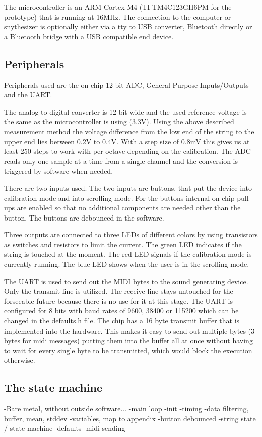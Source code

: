\documentclass{article}
\begin{document}
The microcontroller is an ARM Cortex-M4 (TI TM4C123GH6PM for the prototype) that is running at 16MHz. The connection to the computer or snythesizer is optionally either via a tty to USB converter, Bluetooth directly or a Bluetooth bridge with a USB compatible end device.

\subsection{Peripherals}
Peripherals used are the on-chip 12-bit ADC, General Purpose Inputs/Outputs and the UART.

The analog to digital converter is 12-bit wide and the used reference voltage is the same as the microcontroller is using (3.3V). Using the above described measurement method the voltage difference from the low end of the string to the upper end lies between 0.2V to 0.4V. With a step size of 0.8mV this gives us at least 250 steps to work with per octave depending on the calibration. The ADC reads only one sample at a time from a single channel and the conversion is triggered by software when needed.

There are two inputs used. The two inputs are buttons, that put the device into calibration mode and into scrolling mode. For the buttons internal on-chip pull-ups are enabled so that no additional components are needed other than the button. The buttons are debounced in the software.

Three outputs are connected to three LEDs of different colors by using transistors as switches and resistors to limit the current. The green LED indicates if the string is touched at the moment. The red LED signals if the calibration mode is currently running. The blue LED shows when the user is in the scrolling mode.

The UART is used to send out the MIDI bytes to the sound generating device. Only the transmit line is utilized. The receive line stays untouched for the forseeable future because there is no use for it at this stage. The UART is configured for 8 bits with baud rates of 9600, 38400 or 115200 which can be changed in the defaults.h file. The chip has a 16 byte transmit buffer that is implemented into the hardware. This makes it easy to send out multiple bytes (3 bytes for midi messages) putting them into the buffer all at once without having to wait for every single byte to be transmitted, which would block the execution otherwise.

\subsection{The state machine}
-Bare metal, without outside software...
-main loop
-init
-timing
-data filtering, buffer, mean, stddev
-variables, map to appendix
-button debounced
-string state / state machine
-defaults
-midi sending
\end{document}
